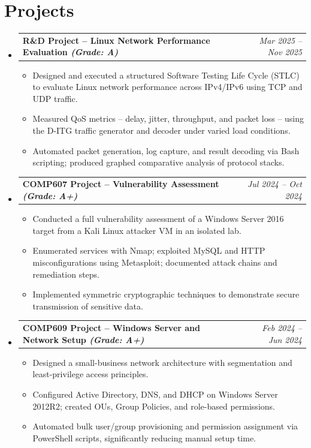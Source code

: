 \documentclass[letterpaper,11pt]{article}
\makeatletter
\newcommand{\resumeItem}[1]{\item\small{{#1}}}
\newcommand{\resumeProjectHeading}[2]{
  \item
    \begin{tabular*}{0.97\textwidth}[t]{l@{\extracolsep{\fill}}r}
      \textbf{#1} & \textit{#2} \\
    \end{tabular*}
}
\newcommand{\resumeSubHeadingListStart}{\begin{itemize}[leftmargin=0.15in, label={}]}
\newcommand{\resumeSubHeadingListEnd}{\end{itemize}}
\newcommand{\resumeItemListStart}{\begin{itemize}[itemsep=4pt]}
\newcommand{\resumeItemListEnd}{\end{itemize}}
\makeatother
\begin{document}
\section{Projects}
\resumeSubHeadingListStart
\resumeProjectHeading
{R\&D Project -- Linux Network Performance Evaluation \textit{(Grade: A)}}{Mar 2025 -- Nov 2025}
\resumeItemListStart
\resumeItem{Designed and executed a structured Software Testing Life Cycle (STLC) to evaluate Linux network performance across IPv4/IPv6 using TCP and UDP traffic.}
\resumeItem{Measured QoS metrics -- delay, jitter, throughput, and packet loss -- using the D-ITG traffic generator and decoder under varied load conditions.}
\resumeItem{Automated packet generation, log capture, and result decoding via Bash scripting; produced graphed comparative analysis of protocol stacks.}
\resumeItemListEnd
\resumeProjectHeading
{COMP607 Project -- Vulnerability Assessment \textit{(Grade: A+)}}{Jul 2024 -- Oct 2024}
\resumeItemListStart
\resumeItem{Conducted a full vulnerability assessment of a Windows Server 2016 target from a Kali Linux attacker VM in an isolated lab.}
\resumeItem{Enumerated services with Nmap; exploited MySQL and HTTP misconfigurations using Metasploit; documented attack chains and remediation steps.}
\resumeItem{Implemented symmetric cryptographic techniques to demonstrate secure transmission of sensitive data.}
\resumeItemListEnd
\resumeProjectHeading
{COMP609 Project -- Windows Server and Network Setup \textit{(Grade: A+)}}{Feb 2024 -- Jun 2024}
\resumeItemListStart
\resumeItem{Designed a small-business network architecture with segmentation and least-privilege access principles.}
\resumeItem{Configured Active Directory, DNS, and DHCP on Windows Server 2012R2; created OUs, Group Policies, and role-based permissions.}
\resumeItem{Automated bulk user/group provisioning and permission assignment via PowerShell scripts, significantly reducing manual setup time.}
\resumeItemListEnd
\resumeSubHeadingListEnd
\end{document}

